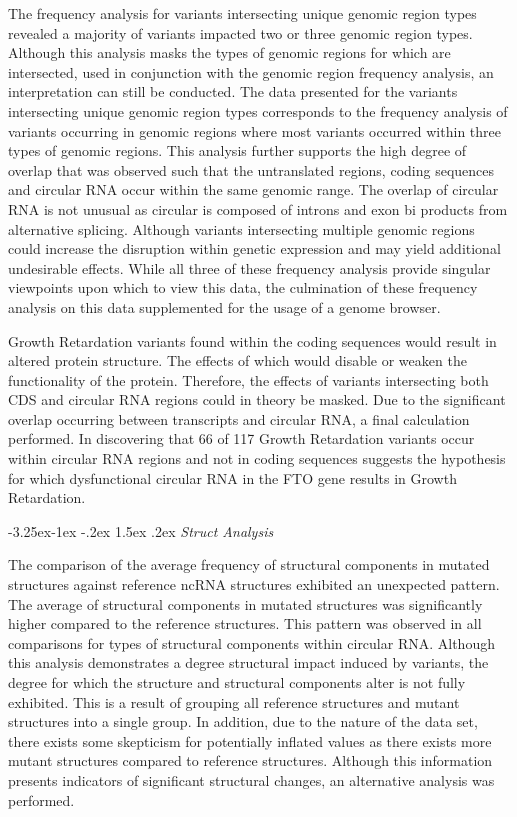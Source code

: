 \documentclass[11pt]{article}
\makeatletter
\renewcommand\subsection{\@startsection{subsection}{2}{\z@}%
                                         {-3.25ex\@plus -1ex \@minus -.2ex}%
                                         {1.5ex \@plus .2ex}%
                                         {\normalfont\fontfamily{phv}\fontsize{14}{17}\bfseries}}
\makeatother
\begin{document}
The frequency analysis for variants intersecting unique genomic region types revealed a majority of variants impacted two or three genomic region types. Although this analysis masks the types of genomic regions for which are intersected, used in conjunction with the genomic region frequency analysis, an interpretation can still be conducted. The data presented for the variants intersecting unique genomic region types corresponds to the frequency analysis of variants occurring in genomic regions where most variants occurred within three types of genomic regions. This analysis further supports the high degree of overlap that was observed such that the untranslated regions, coding sequences and circular RNA occur within the same genomic range. The overlap of circular RNA is not unusual as circular is composed of introns and exon bi products from alternative splicing. Although variants intersecting multiple genomic regions could increase the disruption within genetic expression and may yield additional undesirable effects. While all three of these frequency analysis provide singular viewpoints upon which to view this data, the culmination of these frequency analysis on this data supplemented for the usage of a genome browser.  

Growth Retardation variants found within the coding sequences would result in altered protein structure. The effects of which would disable or weaken the functionality of the protein. Therefore, the effects of variants intersecting both CDS and circular RNA regions could in theory be masked. Due to the significant overlap occurring between transcripts and circular RNA, a final calculation performed. In discovering that 66 of 117 Growth Retardation variants occur within circular RNA regions and not in coding sequences suggests the hypothesis for which dysfunctional circular RNA in the FTO gene results in Growth Retardation. 

 

\subsection{
\emph{Struct Analysis}} \label{s:conclusion}

The comparison of the average frequency of structural components in mutated structures against reference ncRNA structures exhibited an unexpected pattern. The average of structural components in mutated structures was significantly higher compared to the reference structures. This pattern was observed in all comparisons for types of structural components within circular RNA. Although this analysis demonstrates a degree structural impact induced by variants, the degree for which the structure and structural components alter is not fully exhibited. This is a result of grouping all reference structures and mutant structures into a single group. In addition, due to the nature of the data set, there exists some skepticism for potentially inflated values as there exists more mutant structures compared to reference structures. Although this information presents indicators of significant structural changes, an alternative analysis was performed. 
\end{document}
